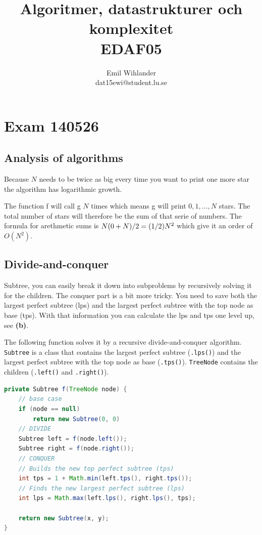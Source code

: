 \documentclass[a4paper]{article}
\title{Algoritmer, datastrukturer och komplexitet\\ EDAF05}
\author{Emil Wihlander\\ dat15ewi@student.lu.se}
\newenvironment{task}[1]
{
	\begin{description}[align=right]
		\item [#1]
}{		%
	\end{description}
}
\newcommand{\taskref}[1]{\textbf{#1}}
\let\*\relax
\DeclareMathOperator{\*}{\cdot}
\begin{document}
 
\maketitle

\section*{Exam 140526}
\subsection*{Analysis of algorithms}

\begin{task}{1. (a)}
	 Because $N$ needs to be twice as big every time you want to print one more star the algorithm has logarithmic growth.
\end{task}

\begin{task}{(b)}
	 The function f will call g $N$ times which means g will print $0, 1, \ldots, N$ stars. The total number of stars will therefore be the sum of that serie of numbers. The formula for arethmetic sums is $N\*(0+N)/2=(1/2)\*N^2$ which give it an order of $O(N^2)$.
\end{task}

\subsection*{Divide-and-conquer}

\begin{task}{2. (a)}
	 Subtree, you can easily break it down into subproblems by recursively solving it for the children. The conquer part is a bit more tricky. You need to save both the largest perfect subtree (lps) and the largest perfect subtree with the top node as base (tps). With that information you can calculate the lps and tps one level up, see \taskref{(b)}. 
\end{task}

\begin{task}{(b)}
	\qquad The following function solves it by a recursive divide-and-conquer algorithm. \texttt{Subtree} is a class that contains the largest perfect subtree (\texttt{.lps()}) and the largest perfect subtree with the top node as base (\texttt{.tps()}). \texttt{TreeNode} contains the children (\texttt{.left()} and \texttt{.right()}).
\begin{lstlisting}[language=Java]
private Subtree f(TreeNode node) {
	// base case
	if (node == null) 
		return new Subtree(0, 0)
	// DIVIDE
	Subtree left = f(node.left());
	Subtree right = f(node.right());
	// CONQUER
	// Builds the new top perfect subtree (tps)
	int tps = 1 + Math.min(left.tps(), right.tps());
	// Finds the new largest perfect subtree (lps)
	int lps = Math.max(left.lps(), right.lps(), tps);
	
	return new Subtree(x, y);
}
\end{lstlisting}
\end{task}
\end{document}
